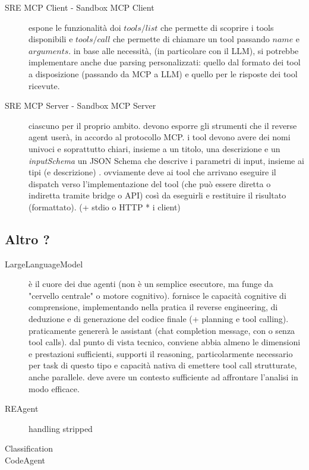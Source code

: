 \begin{description}
    \item[SRE MCP Client - Sandbox MCP Client] espone le funzionalità doi $tools/list$ che permette di scoprire i tools disponibili e $tools/call$ che permette di chiamare un tool passando $name$ e $arguments$. in base alle necessità, (in particolare con il LLM), si potrebbe implementare anche due parsing personalizzati: quello dal formato dei tool a disposizione (passando da MCP a LLM) e quello per le risposte dei tool ricevute.
    \item[SRE MCP Server - Sandbox MCP Server] ciascuno per il proprio ambito. devono esporre gli strumenti che il reverse agent userà, in accordo al protocollo MCP. i tool devono avere dei nomi univoci e soprattutto chiari, insieme a un titolo, una descrizione e un \textit{inputSchema} un JSON Schema che descrive i parametri di input, insieme ai tipi (e descrizione) \cite{mcp}. ovviamente deve ai tool che arrivano eseguire il dispatch verso l'implementazione del tool (che può essere diretta o indiretta tramite bridge o API) così da eseguirli e restituire il risultato (formattato). (+ stdio o HTTP * i client)
\end{description}

\subsection{Altro ?}

\begin{description}
    \item[LargeLanguageModel] è il cuore dei due agenti (non è un semplice esecutore, ma funge da "cervello centrale" o motore cognitivo). fornisce le capacità cognitive di comprensione, implementando nella pratica il reverse engineering, di deduzione e di generazione del codice finale (+ planning e tool calling). praticamente genererà le assistant (chat completion message, con o senza tool calls). dal punto di vista tecnico, conviene abbia almeno le dimensioni e prestazioni sufficienti, supporti il reasoning, particolarmente necessario per task di questo tipo e capacità nativa di emettere tool call strutturate, anche parallele. deve avere un contesto sufficiente ad affrontare l'analisi in modo efficace.
    \item[REAgent] handling stripped
    \item[Classification]
    \item[CodeAgent]  
\end{description}

